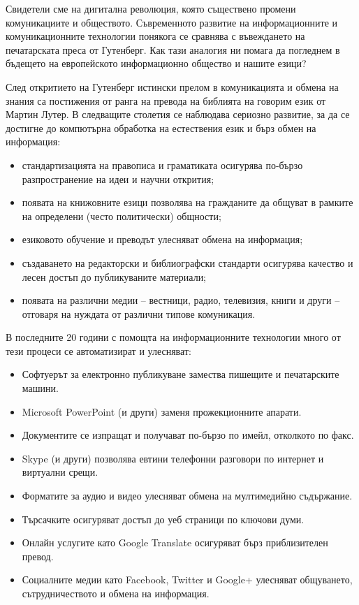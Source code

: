 \documentclass[]{../../metanetpaper}
\begin{document}
\begin{multicols}{2}

Свидетели сме на дигитална революция, която съществено промени комуникациите и обществото. Съвременното развитие на информационните и  комуникационните технологии понякога се сравнява с въвеждането на печатарската преса от Гутенберг. Как тази аналогия ни помага да погледнем в бъдещето на европейското информационно общество и нашите езици?


След откритието на Гутенберг истински прелом в комуникацията и обмена на знания са постижения от ранга на превода на библията на говорим език от Мартин Лутер. В следващите
 столетия се наблюдава сериозно развитие, за да се достигне до компютърна
обработка на естествения език и бърз обмен на информация:

\begin{itemize}
\item стандартизацията на правописа и граматиката осигурява по-бързо разпространение на идеи и научни открития;
\item появата на книжовните езици позволява на гражданите да общуват в рамките на определени  (често политически) общности;
\item езиковото обучение и преводът улесняват обмена на информация;
\item  създаването на редакторски и библиографски стандарти осигурява качество и лесен достъп до публикуваните материали;
\item появата на различни медии -- вестници, радио, телевизия, книги и други -- отговаря на нуждата от различни типове комуникация.
\end{itemize}

В последните 20 години с помощта на информационните технологии много от тези процеси се автоматизират и улесняват:

\begin{itemize}
\item Софтуерът за електронно публикуване замества пишещите и печатарските машини.
\item Microsoft PowerPoint (и други) заменя прожекционните апарати.
\item Документите се изпращат и получават по-бързо по имейл, отколкото по факс.
\item Skype (и други) позволява евтини телефонни разговори по интернет и виртуални срещи.
\item Форматите за аудио и видео улесняват обмена на мултимедийно съдържание.
\item Търсачките осигуряват достъп до уеб страници по ключови думи.
\item Онлайн услугите като Google Translate осигуряват бърз приблизителен превод.
\item Социалните медии като Facebook,  Twitter  и  Google+  улесняват общуването, сътрудничеството и обмена на информация.
\end{itemize}


\end{multicols}
\end{document}
